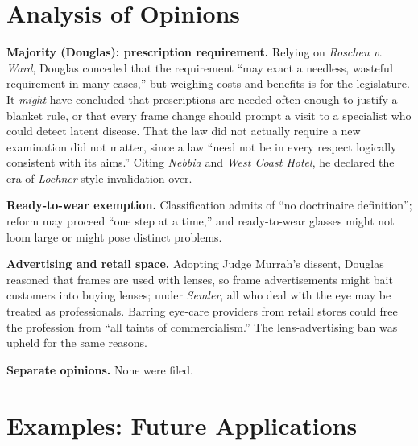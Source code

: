 \documentclass[12pt]{article}
\begin{document}
\section{Analysis of Opinions}

\textbf{Majority (Douglas): prescription requirement.} Relying on \textit{Roschen v. Ward}, Douglas conceded that the requirement ``may exact a needless, wasteful requirement in many cases,'' but weighing costs and benefits is for the legislature. It \textit{might} have concluded that prescriptions are needed often enough to justify a blanket rule, or that every frame change should prompt a visit to a specialist who could detect latent disease. That the law did not actually require a new examination did not matter, since a law ``need not be in every respect logically consistent with its aims.'' Citing \textit{Nebbia} and \textit{West Coast Hotel}, he declared the era of \textit{Lochner}-style invalidation over.

\textbf{Ready-to-wear exemption.} Classification admits of ``no doctrinaire definition''; reform may proceed ``one step at a time,'' and ready-to-wear glasses might not loom large or might pose distinct problems.

\textbf{Advertising and retail space.} Adopting Judge Murrah's dissent, Douglas reasoned that frames are used with lenses, so frame advertisements might bait customers into buying lenses; under \textit{Semler}, all who deal with the eye may be treated as professionals. Barring eye-care providers from retail stores could free the profession from ``all taints of commercialism.'' The lens-advertising ban was upheld for the same reasons.

\textbf{Separate opinions.} None were filed.

\section{Examples: Future Applications}
\end{document}
